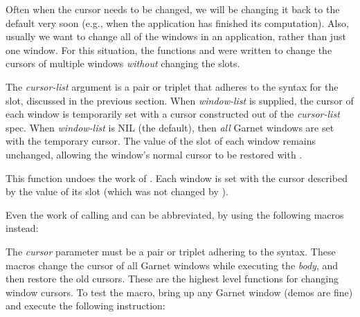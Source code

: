 Often when the cursor needs to be changed, we will be changing it back to
the default very soon (e.g., when the application has finished its
computation).
Also, usually we want to change all of the windows in an application, rather
than just one window.  For this situation, the functions
 and
 were written to change the cursors of multiple
windows {\it without} changing the  slots.


The {\it cursor-list} argument is a pair or triplet that adheres to the syntax
for the  slot, discussed in the previous section.  When
{\it window-list} is supplied, the cursor of each window is temporarily set
with a cursor constructed out of the
{\it cursor-list} spec.  When {\it window-list} is NIL (the default), then {\it all}
Garnet windows are set with the temporary cursor.  The value of the
 slot of
each window remains unchanged, allowing the window's normal cursor to be
restored with .


This function undoes the work of .  Each window is set
with the cursor described by the value of its  slot (which was
not changed by ).


Even the work of calling  and 
can be abbreviated, by using the following macros instead:

 

The {\it cursor} parameter must be a pair or triplet adhering to the 
syntax.  These macros change the cursor of all Garnet windows while executing
the {\it body}, and then restore the old cursors.  These are the highest level
functions for changing window cursors.
To test the  macro, bring up any Garnet window
(demos are fine) and execute the following instruction:


